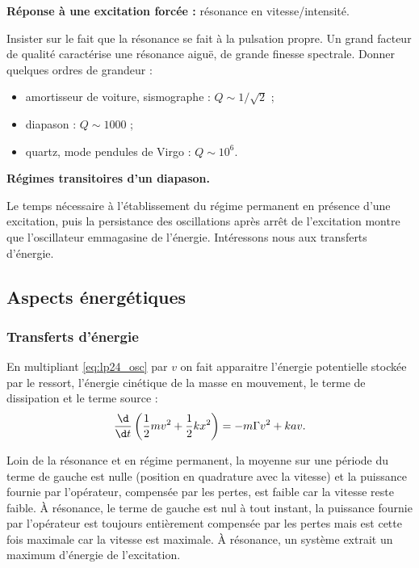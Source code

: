 \begin{slide}
\textbf{Réponse à une excitation forcée :} résonance en vitesse/intensité.
\end{slide}

Insister sur le fait que la résonance se fait à la pulsation propre.
Un grand facteur de qualité caractérise une résonance aiguë, de grande finesse spectrale.
Donner quelques ordres de grandeur :
\begin{itemize}
\item amortisseur de voiture, sismographe : $Q \sim 1/\sqrt{2}$ ;
\item diapason : $Q \sim 1000$ ;
\item quartz, mode pendules de Virgo : $Q \sim 10^6$.
\end{itemize}

\begin{experience}
\textbf{Régimes transitoires d'un diapason.}
\end{experience}

\begin{transition}
Le temps nécessaire à l'établissement du régime permanent en présence d'une excitation, puis la persistance des oscillations après arrêt de l'excitation montre que l'oscillateur emmagasine de l'énergie.
Intéressons nous aux transferts d'énergie.
\end{transition}

\subsection{Aspects énergétiques}

\subsubsection{Transferts d'énergie}

En multipliant \eqref{eq:lp24_osc} par $v$ on fait apparaitre l'énergie potentielle stockée par le ressort, l'énergie cinétique de la masse en mouvement, le terme de dissipation et le terme source : 
\begin{equation}
\frac{\d}{\d t} \left( \frac{1}{2}mv^2 + \frac{1}{2}kx^2 \right) = -m\Gamma v^2 + kav.
\end{equation}

Loin de la résonance et en régime permanent, la moyenne sur une période du terme de gauche est nulle (position en quadrature avec la vitesse) et la puissance fournie par l'opérateur, compensée par les pertes, est faible car la vitesse reste faible.
À résonance, le terme de gauche est nul à tout instant, la puissance fournie par l'opérateur est toujours entièrement compensée par les pertes mais est cette fois maximale car la vitesse est maximale.
À résonance, un système extrait un maximum d'énergie de l'excitation.


